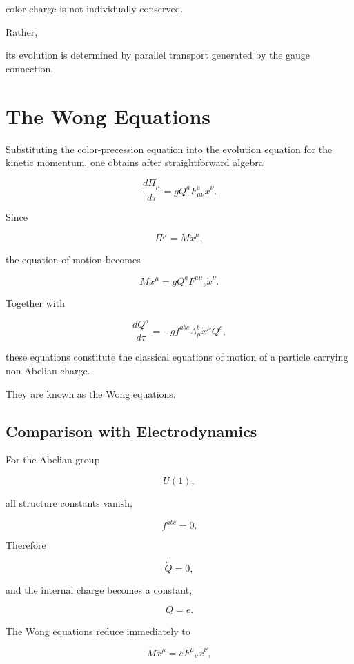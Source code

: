 color charge is not individually conserved.

Rather,

its evolution is determined by parallel transport generated by the gauge
connection.


\section{The Wong Equations}

Substituting the color-precession equation into the evolution equation
for the kinetic momentum, one obtains after straightforward algebra

\[
\boxed{
\frac{d\Pi_\mu}{d\tau}
=
gQ^a
F_{\mu\nu}^a
\dot x^\nu.
}
\]

Since

\[
\Pi^\mu
=
M\dot x^\mu,
\]

the equation of motion becomes

\[
\boxed{
M
\ddot x^\mu
=
gQ^a
F^{a\mu}{}_{\nu}
\dot x^\nu.
}
\]

Together with

\[
\boxed{
\frac{dQ^a}{d\tau}
=
-
gf^{abc}
A_\mu^b
\dot x^\mu
Q^c,
}
\]

these equations constitute the classical equations of motion of a
particle carrying non-Abelian charge.

They are known as the Wong equations.


\subsection{Comparison with Electrodynamics}

For the Abelian group

\[
U(1),
\]

all structure constants vanish,

\[
f^{abc}=0.
\]

Therefore

\[
\dot Q=0,
\]

and the internal charge becomes a constant,

\[
Q=e.
\]

The Wong equations reduce immediately to

\[
M\ddot x^\mu
=
eF^{\mu}{}_{\nu}
\dot x^\nu,
\]

